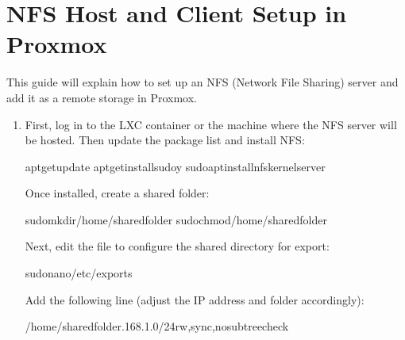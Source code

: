 \documentclass[letterpaper,10pt,english]{sphinxmanual}
\begin{document}
\chapter{NFS Host and Client Setup in Proxmox}
\label{\detokenize{nfs_proxmox_setup:nfs-host-and-client-setup-in-proxmox}}\label{\detokenize{nfs_proxmox_setup::doc}}
\sphinxAtStartPar
This guide will explain how to set up an NFS (Network File Sharing) server and add it as a remote storage in Proxmox.
\begin{enumerate}
%
\item {} 
\sphinxAtStartPar
{}

\sphinxAtStartPar
First, log in to the LXC container or the machine where the NFS server will be hosted. Then update the package list and install NFS:

\begin{sphinxVerbatim}[commandchars=\\\{\}]
apt\PYGZhy{}getupdate
apt\PYGZhy{}getinstallsudo\PYGZhy{}y
sudoaptinstallnfs\PYGZhy{}kernel\PYGZhy{}server
\end{sphinxVerbatim}

\sphinxAtStartPar
Once installed, create a shared folder:

\begin{sphinxVerbatim}[commandchars=\\\{\}]
sudomkdir/home/sharedfolder
sudochmod/home/sharedfolder
\end{sphinxVerbatim}

\sphinxAtStartPar
Next, edit the  file to configure the shared directory for export:

\begin{sphinxVerbatim}[commandchars=\\\{\}]
sudonano/etc/exports
\end{sphinxVerbatim}

\sphinxAtStartPar
Add the following line (adjust the IP address and folder accordingly):

\begin{sphinxVerbatim}[commandchars=\\\{\}]
/home/sharedfolder.168.1.0/24rw,sync,no\PYGZus{}subtree\PYGZus{}check
\end{sphinxVerbatim}


\end{enumerate}
\end{document}
